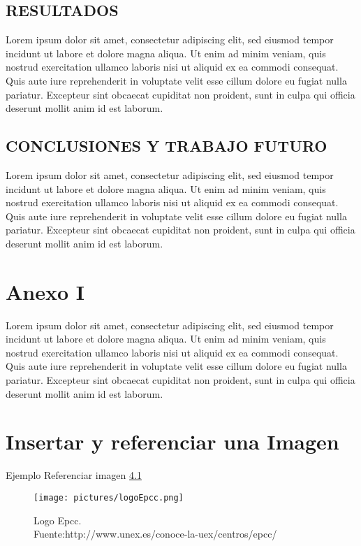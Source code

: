 \documentclass[12pt,a4paper,twoside]{article} %
\begin{document}
\section{RESULTADOS}
\label{sec:resultados}

Lorem ipsum dolor sit amet, consectetur adipiscing elit, sed eiusmod tempor incidunt ut labore et dolore magna aliqua. Ut enim ad minim veniam, quis nostrud exercitation ullamco laboris nisi ut aliquid ex ea commodi consequat. Quis aute iure reprehenderit in voluptate velit esse cillum dolore eu fugiat nulla pariatur. Excepteur sint obcaecat cupiditat non proident, sunt in culpa qui officia deserunt mollit anim id est laborum.


\section{CONCLUSIONES Y TRABAJO FUTURO}
\label{sec:conclusiones}

Lorem ipsum dolor sit amet, consectetur adipiscing elit, sed eiusmod tempor incidunt ut labore et dolore magna aliqua. Ut enim ad minim veniam, quis nostrud exercitation ullamco laboris nisi ut aliquid ex ea commodi consequat. Quis aute iure reprehenderit in voluptate velit esse cillum dolore eu fugiat nulla pariatur. Excepteur sint obcaecat cupiditat non proident, sunt in culpa qui officia deserunt mollit anim id est laborum.


\appendix
\clearpage
\appendixpage
\addappheadtotoc

\chapter{\textbf{Anexo I\\}}
Lorem ipsum dolor sit amet, consectetur adipiscing elit, sed eiusmod tempor incidunt ut labore et dolore magna aliqua. Ut enim ad minim veniam, quis nostrud exercitation ullamco laboris nisi ut aliquid ex ea commodi consequat. Quis aute iure reprehenderit in voluptate velit esse cillum dolore eu fugiat nulla pariatur. Excepteur sint obcaecat cupiditat non proident, sunt in culpa qui officia deserunt mollit anim id est laborum.\\

\chapter{\textbf{Insertar y referenciar una Imagen\\}}
Ejemplo Referenciar imagen \ref{fig:logoEpcc}
\begin{figure}[H]
\centering
\texttt{[image: pictures/logoEpcc.png]}
\caption[Logo Epcc]{Logo Epcc.\\Fuente:http://www.unex.es/conoce-la-uex/centros/epcc/}
\label{fig:logoEpcc}
\end{figure}
\end{document}
